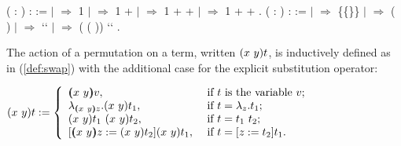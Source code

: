 \begin{coqdoccode}
\coqdocemptyline
\coqdocnoindent
{}  ( : ) :  :=\coqdoceol
\coqdocindent{1.00em}
  \coqdoceol
\coqdocindent{1.00em}
\ensuremath{|}   \ensuremath{\Rightarrow} 1\coqdoceol
\coqdocindent{1.00em}
\ensuremath{|}    \ensuremath{\Rightarrow} 1 +  \coqdoceol
\coqdocindent{1.00em}
\ensuremath{|}    \ensuremath{\Rightarrow} 1 +   +  \coqdoceol
\coqdocindent{1.00em}
\ensuremath{|}     \ensuremath{\Rightarrow} 1 +   +  \coqdoceol
\coqdocindent{1.00em}
.\coqdoceol
\coqdocemptyline
\coqdocnoindent
{}  ( : ) :  :=\coqdoceol
\coqdocindent{1.00em}
  \coqdoceol
\coqdocindent{1.00em}
\ensuremath{|}   \ensuremath{\Rightarrow} \{\{\}\}\coqdoceol
\coqdocindent{1.00em}
\ensuremath{|}    \ensuremath{\Rightarrow}   ( )\coqdoceol
\coqdocindent{1.00em}
\ensuremath{|}    \ensuremath{\Rightarrow}   ``  \coqdoceol
\coqdocindent{1.00em}
\ensuremath{|}     \ensuremath{\Rightarrow} (  ( )) ``  \coqdoceol
\coqdocindent{1.00em}
.\coqdoceol
\coqdocemptyline
\end{coqdoccode}
The action of a permutation on a term, written $(x\ y) t$, is inductively defined as in (\ref{def:swap}) with the additional case for the explicit substitution operator:\vspace{.5cm}


$\swap{x}{y}{t} := \left\{ \begin{array}{ll}
\vswap{x}{y}{v}, & \mbox{ if } t \mbox{ is the variable } v; \\
\lambda_{\vswap{x}{y}{z}}. \swap{x}{y}{t_1}, & \mbox{ if } t = \lambda_z.t_1; \\
\swap{x}{y}{t_1}\ \swap{x}{y}{t_2}, & \mbox{ if } t = t_1\ t_2;\\
\esub{\swap{x}{y}{t_1}}{\vswap{x}{y}{z}}{\swap{x}{y}{t_2}}, & \mbox{ if } t = \esub{t_1}{z}{t_2}.
\end{array}\right.$ \vspace{.5cm}


